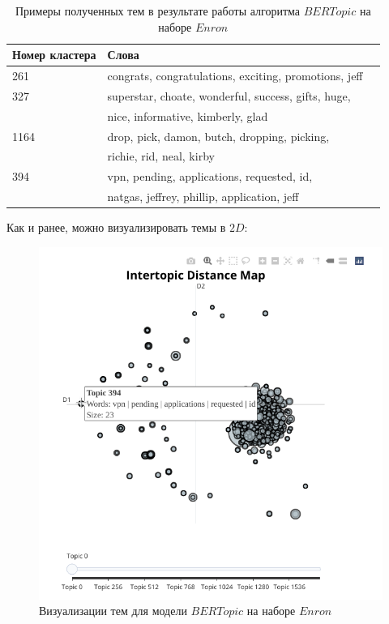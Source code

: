 \begin{table}[H]
\centering
\begin{tabular}{ | l | l | l | }
\hline
Номер кластера & Слова \\ \hline
261 & congrats, congratulations, exciting, promotions, jeff \\ \hline
327 & superstar, choate, wonderful, success, gifts, huge, 
\\ & nice, informative, kimberly, glad \\ \hline
1164 & drop, pick, damon, butch, dropping, picking,
\\ &  richie, rid, neal, kirby \\ \hline
394 & vpn, pending, applications, requested, id, 
\\ & natgas, jeffrey, phillip, application, jeff \\ \hline
\end{tabular}
\caption{Примеры полученных тем в результате работы алгоритма $BERTopic$ на наборе $Enron$}
\end{table}


Как и ранее, можно визуализировать темы в $2D$:

\begin{figure}[H]
\centering
\includegraphics[scale=0.9]{pics/bert-2d-results.png}
\caption{Визуализации тем для модели $BERTopic$ на наборе $Enron$}
\end{figure}

